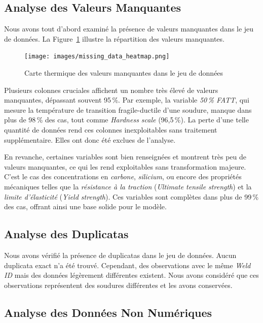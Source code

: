 \documentclass{article}
\begin{document}
\subsection{Analyse des Valeurs Manquantes}

Nous avons tout d'abord examiné la présence de valeurs manquantes dans le jeu de données. La Figure~\ref{fig:missing_heatmap} illustre la répartition des valeurs manquantes.

\begin{figure}[H]
    \centering
    \texttt{[image: images/missing\_data\_heatmap.png]}
    \caption{Carte thermique des valeurs manquantes dans le jeu de données}
    \label{fig:missing_heatmap}
\end{figure}

Plusieurs colonnes cruciales affichent un nombre très élevé de valeurs manquantes, dépassant souvent 95\,\%. Par exemple, la variable \textit{50\,\% FATT}, qui mesure la température de transition fragile-ductile d'une soudure, manque dans plus de 98\,\% des cas, tout comme \textit{Hardness scale} (96,5\,\%). La perte d'une telle quantité de données rend ces colonnes inexploitables sans traitement supplémentaire. Elles ont donc été exclues de l'analyse.

En revanche, certaines variables sont bien renseignées et montrent très peu de valeurs manquantes, ce qui les rend exploitables sans transformation majeure. C'est le cas des concentrations en \textit{carbone}, \textit{silicium}, ou encore des propriétés mécaniques telles que la \textit{résistance à la traction} (\textit{Ultimate tensile strength}) et la \textit{limite d'élasticité} (\textit{Yield strength}). Ces variables sont complètes dans plus de 99\,\% des cas, offrant ainsi une base solide pour le modèle.

\subsection{Analyse des Duplicatas}

Nous avons vérifié la présence de duplicatas dans le jeu de données. Aucun duplicata exact n'a été trouvé. Cependant, des observations avec le même \textit{Weld ID} mais des données légèrement différentes existent. Nous avons considéré que ces observations représentent des soudures différentes et les avons conservées.

\subsection{Analyse des Données Non Numériques}
\end{document}
